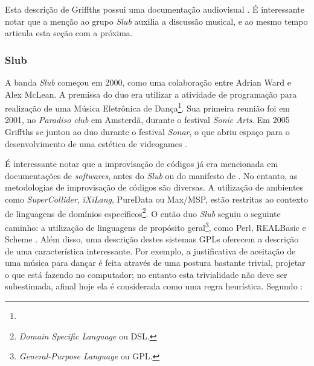 Esta descrição de Griffths possui uma documentação audiovisual . É interessante notar que a menção ao grupo \emph{Slub} auxilia a discussão musical, e ao mesmo tempo articula esta seção com a próxima. 

\subsubsection{Slub}

A banda \emph{Slub} começou em 2000, como uma colaboração entre Adrian Ward e Alex McLean. A premissa do duo era utilizar a atividade de programação para realização de uma Música Eletrônica de Dança\footnote{}. Sua primeira reunião foi em 2001, no \emph{Paradiso club} em Amsterdã, durante o festival \emph{Sonic Arts}. Em 2005 Griffths se juntou ao duo durante o festival \emph{Sonar}, o que abriu espaço para o desenvolvimento de uma estética de videogames \cite[p.~138--140]{McLean2011}.

É interessante notar que a improvisação de códigos já era mencionada em documentações de \emph{softwares}, antes do \emph{Slub} ou do manifesto de . No entanto, as metodologias de improvisação de códigos são diversas. A utilização de ambientes como \emph{SuperCollider}, \emph{iXiLang}, PureData ou Max/MSP, estão restritas ao contexto de linguagens de domínios específicos\footnote{\emph{Domain Specific Language} ou DSL.}. O então duo \emph{Slub} seguiu o seguinte caminho: a utilização de linguagens de propósito geral\footnote{\emph{General-Purpose Language} ou GPL.}, como Perl, REALBasic e Scheme . Além disso, uma descrição destes sistemas GPLs oferecem a descrição de uma característica interessante. Por exemplo, a justificativa de aceitação de uma música para dançar  é feita através de uma postura bastante trivial, projetar o que está fazendo no computador; no entanto esta trivialidade não deve ser subestimada, afinal hoje ela é considerada como uma regra heurística. Segundo :

